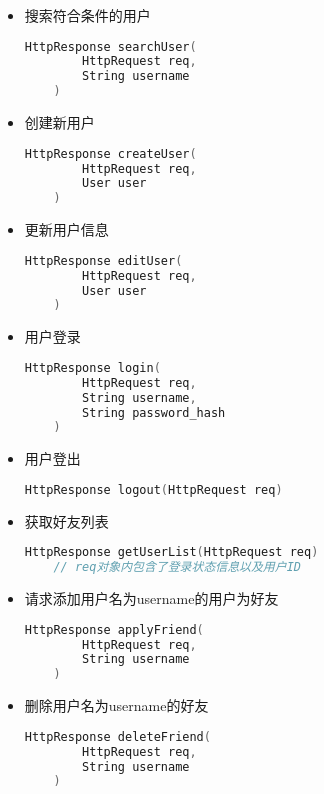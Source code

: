 {\begin{itemize}
    \item 搜索符合条件的用户
    \begin{lstlisting}[language=c++]
    HttpResponse searchUser(
        HttpRequest req,
        String username
    )
    \end{lstlisting}

    \item 创建新用户
    \begin{lstlisting}[language=c++]
    HttpResponse createUser(
        HttpRequest req,
        User user
    )
    \end{lstlisting}

    \item 更新用户信息
    \begin{lstlisting}[language=c++]
    HttpResponse editUser(
        HttpRequest req,
        User user
    )
    \end{lstlisting}

    \item 用户登录
    \begin{lstlisting}[language=c++]
    HttpResponse login(
        HttpRequest req,
        String username,
        String password_hash
    )
    \end{lstlisting}

    \item 用户登出
    \begin{lstlisting}[language=c++]
    HttpResponse logout(HttpRequest req)
    \end{lstlisting}

    \item 获取好友列表
    \begin{lstlisting}[language=c++]
    HttpResponse getUserList(HttpRequest req) 
    // req对象内包含了登录状态信息以及用户ID
    \end{lstlisting}

    \item 请求添加用户名为username的用户为好友
    \begin{lstlisting}[language=c++]
    HttpResponse applyFriend(
        HttpRequest req,
        String username
    )
    \end{lstlisting}

    \item 删除用户名为username的好友
    \begin{lstlisting}[language=c++]
    HttpResponse deleteFriend(
        HttpRequest req,
        String username
    )
    \end{lstlisting}


\end{itemize}}
